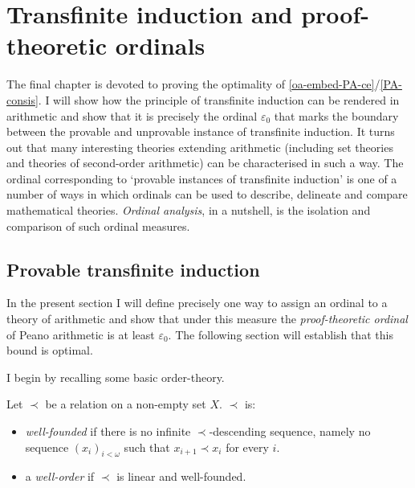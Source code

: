 \chapter{Transfinite induction and proof-theoretic ordinals}
\label{c-TI-and-PTO}

The final chapter is devoted to proving the optimality of \cref{oa-embed-PA-ce}/\cref{PA-consis}.
I will show how the principle of transfinite induction can be rendered in arithmetic and show that it is precisely the ordinal \( ε_0 \) that marks the boundary between the provable and unprovable instance of transfinite induction.
It turns out that many interesting theories extending arithmetic (including set theories and theories of second-order arithmetic) can be characterised in such a way.
The ordinal corresponding to ‘provable instances of transfinite induction’ is one of a number of ways in which ordinals can be used to describe, delineate and compare mathematical theories.
\emph{Ordinal analysis}, in a nutshell, is the isolation and comparison of such ordinal measures.


\section{Provable transfinite induction}\label{s-oa-lower}
In the present section I will define precisely one way to assign an ordinal to a theory of arithmetic and show that under this measure the \emph{proof-theoretic ordinal} of Peano arithmetic is at least \( ε_0 \).
The following section will establish that this bound is optimal.

I begin by recalling some basic order-theory.
\begin{definition}
	Let \( ≺ \) be a relation on a non-empty set \( X \).
	\( ≺ \) is:
	\begin{itemize}
		\item \emph{well-founded} if there is no infinite \( ≺ \)-descending sequence, namely no sequence \( (x_i)_{i<ω} \) such that \( x_{i+1} ≺ x_i \) for every \( i \).
		\item a \emph{well-order} if \( ≺ \) is linear and well-founded.
	\end{itemize}
\end{definition}

